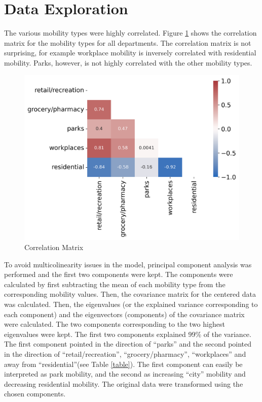 \documentclass[paper=a4, fontsize=11pt]{scrartcl}
\begin{document}
\section{Data Exploration}
The various mobility types were highly correlated. Figure \ref{corr_mat} shows the correlation matrix for the mobility types for all departments. The correlation matrix is not surprising,  for example workplace mobility is inversely correlated with residential mobility. Parks, however, is not highly correlated with the other mobility types.


\begin{figure}[!htb]\label{corr_mat}
\centering
\includegraphics[width=.7\textwidth]{corr.png}
\caption{Correlation Matrix}
\end{figure}

To avoid multicolinearity issues in the model, principal component analysis was performed and the first two components were kept. The components were calculated by first subtracting the mean of each mobility type from the corresponding mobility values. Then, the covariance matrix for the centered data was calculated. Then, the eigenvalues (or the explained variance corresponding to each component) and the eigenvectors (components) of the covariance matrix were calculated. The two components corresponding to the two highest eigenvalues were kept. The first two components explained 99\% of the variance. The first component  pointed in the direction of ``parks'' and the second pointed in the direction of ``retail/recreation'', ``grocery/pharmacy'', ``workplaces'' and away from ``residential''(see Table \ref{table}). The first component can easily be interpreted as park mobility, and the second as increasing ``city'' mobility and decreasing residential mobility. The original data were transformed using the chosen components.\\
\end{document}
